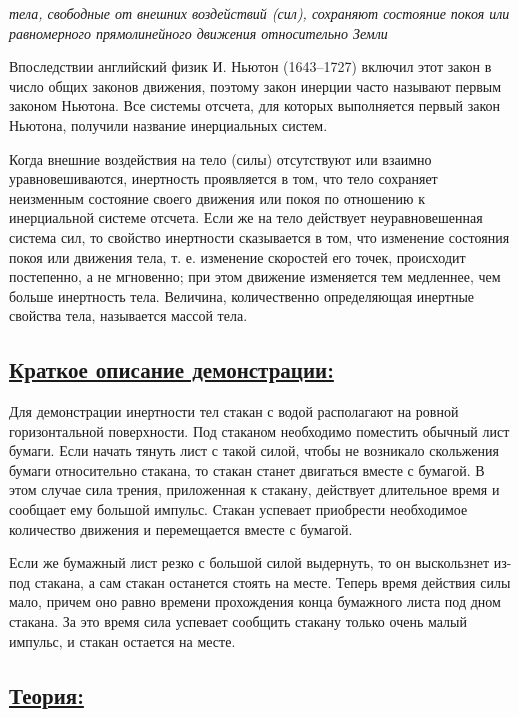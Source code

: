 \documentclass[14pt,a4paper,oneside]{extarticle}	%
\begin{document}
\begin{flushleft}
	
	\textit{тела, свободные от внешних воздействий (сил), сохраняют состояние 
покоя или равномерного прямолинейного движения относительно 
Земли}
\end{flushleft}


Впоследствии английский физик И. Ньютон (1643–1727) включил этот закон в число общих законов движения, поэтому закон инерции часто называют первым законом Ньютона. 
Все системы отсчета, для которых выполняется первый закон 
Ньютона, получили название инерциальных систем. 

Когда внешние воздействия на тело (силы) отсутствуют или взаимно уравновешиваются, инертность проявляется в том, что тело сохраняет неизменным состояние своего движения или покоя по отношению к инерциальной системе отсчета.
Если же на тело действует неуравновешенная система сил, то свойство инертности сказывается в том, что изменение состояния покоя или движения тела, т. е. изменение скоростей его точек, происходит постепенно, а не мгновенно; при этом движение изменяется тем медленнее, чем больше инертность тела.
Величина, количественно определяющая инертные свойства 
тела, называется массой тела. 

\newpage
\subsection*{\underline{Краткое описание демонстрации:}}

Для демонстрации инертности тел стакан с водой располагают на ровной горизонтальной поверхности.
Под стаканом необходимо поместить обычный лист бумаги.
Если начать тянуть лист с такой силой, чтобы не 
возникало скольжения бумаги относительно стакана, то стакан станет двигаться вместе с бумагой.
В этом случае сила трения, приложенная к стакану, действует длительное время и сообщает ему большой импульс. 
Стакан успевает приобрести необходимое количество движения и перемещается вместе с бумагой. 

Если же бумажный лист резко с большой силой выдернуть, то он выскользнет из-под стакана, 
а сам стакан останется стоять на месте. 
Теперь время действия силы мало, причем оно равно времени прохождения конца 
бумажного листа под дном стакана.
За это время сила успевает сообщить стакану только очень малый импульс, и стакан остается 
на месте. 

\newpage
\subsection*{\underline{Теория:}}
\end{document}
